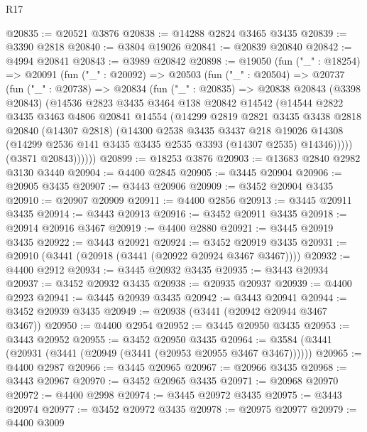\begin{lexlean}{R17}
\begin{coremodule}
@20835 := @20521 @3876
@20838 := @14288 @2824 @3465 @3435
@20839 := @3390 @2818
@20840 := @3804 @19026
@20841 := @20839 @20840
@20842 := @4994 @20841
@20843 := @3989 @20842
@20898 := @19050
    (fun ("_" : @18254) =>
    @20091
      (fun ("_" : @20092) =>
      @20503
        (fun ("_" : @20504) =>
        @20737
          (fun ("_" : @20738) =>
          @20834
            (fun ("_" : @20835) =>
            @20838
              @20843
              (@3398 @20843)
              (@14536
                @2823
                @3435
                @3464
                @138
                @20842
                @14542
                (@14544
                  @2822
                  @3435
                  @3463
                  @4806
                  @20841
                  @14554
                  (@14299
                    @2819
                    @2821
                    @3435
                    @3438
                    @2818
                    @20840
                    (@14307 @2818)
                    (@14300
                      @2538
                      @3435
                      @3437
                      @218
                      @19026
                      @14308
                      (@14299 @2536 @141 @3435 @3435 @2535 @3393 (@14307 @2535) @14346)))))
              (@3871 @20843))))))
@20899 := @18253 @3876
@20903 := @13683 @2840 @2982 @3130 @3440
@20904 := @4400 @2845
@20905 := @3445 @20904
@20906 := @20905 @3435
@20907 := @3443 @20906
@20909 := @3452 @20904 @3435
@20910 := @20907 @20909
@20911 := @4400 @2856
@20913 := @3445 @20911 @3435
@20914 := @3443 @20913
@20916 := @3452 @20911 @3435
@20918 := @20914 @20916 @3467
@20919 := @4400 @2880
@20921 := @3445 @20919 @3435
@20922 := @3443 @20921
@20924 := @3452 @20919 @3435
@20931 := @20910 (@3441 (@20918 (@3441 (@20922 @20924 @3467 @3467))))
@20932 := @4400 @2912
@20934 := @3445 @20932 @3435
@20935 := @3443 @20934
@20937 := @3452 @20932 @3435
@20938 := @20935 @20937
@20939 := @4400 @2923
@20941 := @3445 @20939 @3435
@20942 := @3443 @20941
@20944 := @3452 @20939 @3435
@20949 := @20938 (@3441 (@20942 @20944 @3467 @3467))
@20950 := @4400 @2954
@20952 := @3445 @20950 @3435
@20953 := @3443 @20952
@20955 := @3452 @20950 @3435
@20964 := @3584 (@3441 (@20931 (@3441 (@20949 (@3441 (@20953 @20955 @3467 @3467))))))
@20965 := @4400 @2987
@20966 := @3445 @20965
@20967 := @20966 @3435
@20968 := @3443 @20967
@20970 := @3452 @20965 @3435
@20971 := @20968 @20970
@20972 := @4400 @2998
@20974 := @3445 @20972 @3435
@20975 := @3443 @20974
@20977 := @3452 @20972 @3435
@20978 := @20975 @20977
@20979 := @4400 @3009

\end{coremodule}
\end{lexlean}
